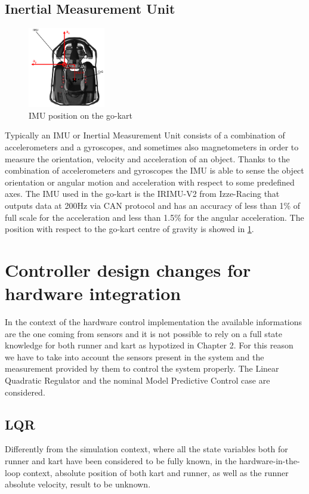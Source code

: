 \documentclass[a4paper,12pt,oneside]{book}
\begin{document}
\subsection*{Inertial Measurement Unit}

\begin{figure}[h!]
	\centering
	\includegraphics[width=0.3\textwidth]{IMU.png}
\caption{IMU position on the go-kart}
\label{IMU_pose}
\end{figure}

Typically an IMU or Inertial Measurement Unit consists of a combination of accelerometers and a gyroscopes, and sometimes also magnetometers in order to measure the orientation, velocity and acceleration of an object.
Thanks to the combination of accelerometers and gyroscopes the IMU is able to sense the object orientation or angular motion and acceleration with respect to some predefined axes.
The IMU used in the go-kart is the IRIMU-V2 from Izze-Racing that outputs data at 200Hz via CAN protocol and has an accuracy of less than 1\% of full scale for the acceleration and less than 1.5\% for the angular acceleration.
The position with respect to the go-kart centre of gravity is showed in \ref{IMU_pose}.


\section{Controller design changes for hardware integration}
In the context of the hardware control implementation the available informations are the one coming from sensors and it is not possible to rely on a full state knowledge for both runner and kart as hypotized in Chapter 2.
For this reason we have to take into account the sensors present in the system and the measurement provided by them to control the system properly. 
The Linear Quadratic Regulator and the nominal Model Predictive Control case are considered.

\subsection*{LQR}
Differently from the simulation context, where all the state variables both for runner and kart have been considered to be fully known, in the hardware-in-the-loop context, absolute position of both kart and runner, as well as the runner absolute velocity, result to be unknown.
\end{document}
